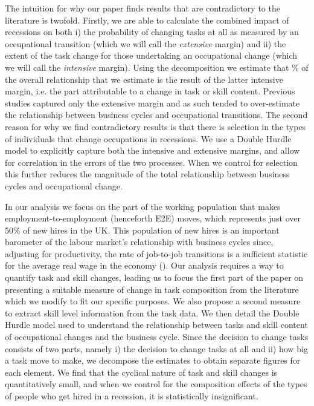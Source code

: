 \documentclass[11pt, oneside]{article}
\begin{document}
	
	


	\vspace{2mm}


\noindent The intuition for why our paper finds results that are contradictory to the literature is twofold.  Firstly, we are able to calculate the combined impact of recessions on both i) the probability of changing tasks at all as measured by an occupational transition (which we will call the \textit{extensive} margin) and ii) the extent of the task change for those undertaking an occupational change (which we will call the \textit{intensive} margin). Using the \cite{Mcdonald1980} decomposition we estimate that \hspace{-1mm}\% of the overall relationship that we estimate is the result of the latter intensive margin, i.e. the part attributable to a change in task or skill content. Previous studies captured only the extensive margin and as such tended to over-estimate the relationship between business cycles and occupational transitions. The second reason for why we find contradictory results is that there is selection in the types of individuals that change occupations in recessions. We use a Double Hurdle model to explicitly capture both the intensive and extensive margins, and allow for correlation in the errors of the two processes. When we control for selection this further reduces the magnitude of the total relationship between business cycles and occupational change.



	
	\vspace{2mm}
	
	In our analysis we focus on the part of the working population that makes employment-to-employment (henceforth E2E) moves, which represents just over 50\% of new hires in the UK. This population of new hires is an important barometer of the labour market's relationship with  business cycles since, adjusting for productivity, the rate of job-to-job transitions is a sufficient statistic for the average real wage in the economy (\cite{MoscariniPostelVinay}). Our analysis requires a way to quantify task and skill changes, leading us to focus the first part of the paper on presenting a suitable measure of change in task composition from the literature which we modify to fit our specific purposes. We also propose a second measure to extract skill level information from the task data. We then detail the Double Hurdle model used to understand the relationship between tasks and skill content of occupational changes and the business cycle. Since the decision to change tasks consists of two parts, namely i) the decision to change tasks at all and ii) how big a task move to make, we decompose the estimates to obtain separate figures for each element. We find that the cyclical nature of task and skill changes is quantitatively small, and when we control for the composition effects of the types of people who get hired in a recession, it is statistically insignificant. 
	
\end{document}
